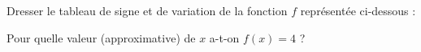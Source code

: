 
\begin{exercice}\label{exosmath-0643}

    Dresser le tableau de signe et de variation de la fonction \( f\) représentée ci-dessous :
    \begin{center}
   
    \end{center}

    Pour quelle valeur (approximative) de \( x\) a-t-on \( f(x)=4\) ?

\end{exercice}
